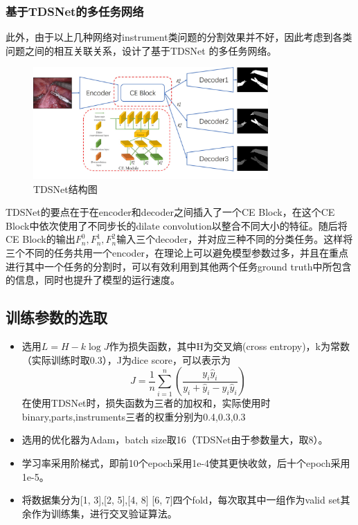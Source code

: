 \documentclass[UTF8]{ctexart}
\begin{document}
\subsubsection{基于TDSNet的多任务网络}
此外，由于以上几种网络对instrument类问题的分割效果并不好，因此考虑到各类问题之间的相互关联关系，设计了基于TDSNet\cite{ren2019task}
的多任务网络。

\begin{figure}[H]
    \centering  %
    \includegraphics[width=0.8\textwidth]{figure/TDSNet.jpg}
    \caption{TDSNet结构图}
\end{figure}
TDSNet的要点在于在encoder和decoder之间插入了一个CE Block，在这个CE Block中依次使用了不同步长的dilate convolution以整合不同大小的特征。随后将CE Block的输出$F_n^0,F_n^1,F_n^2$输入三个decoder，并对应三种不同的分类任务。这样将三个不同的任务共用一个encoder，在理论上可以避免模型参数过多，并且在重点进行其中一个任务的分割时，可以有效利用到其他两个任务ground truth中所包含的信息，同时也提升了模型的运行速度。

\subsection{训练参数的选取}
\begin{itemize}
    \item 选用$L=H-k\log J$作为损失函数，其中H为交叉熵(cross entropy)，k为常数（实际训练时取0.3），J为dice score，可以表示为
    $$J=\frac{1}{n}\sum_{i=1}^n(\frac{y_i\hat{y}_i}{y_i+\hat{y}_i-y_i\hat{y}_i})$$
    在使用TDSNet时，损失函数为三者的加权和，实际使用时binary,parts,instruments三者的权重分别为0.4,0.3,0.3
    \item 选用的优化器为Adam，batch size取16（TDSNet由于参数量大，取8）。
    \item 学习率采用阶梯式，即前10个epoch采用1e-4使其更快收敛，后十个epoch采用1e-5。
    \item 将数据集分为[1, 3],[2, 5],[4, 8] [6, 7]四个fold，每次取其中一组作为valid set其余作为训练集，进行交叉验证算法。
\end{itemize}
\end{document}
